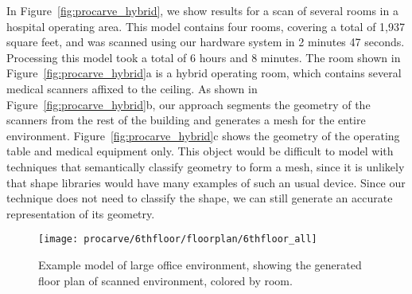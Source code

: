 \documentclass[12pt,onecolumn,oneside]{book}
\begin{document}
In Figure~\ref{fig:procarve_hybrid}, we show results for a scan of several rooms in a hospital operating area.  This model contains four rooms, covering a total of 1,937 square feet, and was scanned using our hardware system in 2 minutes 47 seconds.  Processing this model took a total of 6 hours and 8 minutes.  The room shown in Figure~\ref{fig:procarve_hybrid}a is a hybrid operating room, which contains several medical scanners affixed to the ceiling.  As shown in Figure~\ref{fig:procarve_hybrid}b, our approach segments the geometry of the scanners from the rest of the building and generates a mesh for the entire environment.  Figure~\ref{fig:procarve_hybrid}c shows the geometry of the operating table and medical equipment only.  This object would be difficult to model with techniques that semantically classify geometry to form a mesh, since it is unlikely that shape libraries would have many examples of such an usual device.  Since our technique does not need to classify the shape, we can still generate an accurate representation of its geometry.

\begin{figure}[t]

	\centerline{\texttt{[image: procarve/6thfloor/floorplan/6thfloor\_all]}}

	\caption[Example model of large office environment, showing floor plan.]{Example model of large office environment, showing the generated floor plan of scanned environment, colored by room.}
	\label{fig:procarve_6thfloor_floorplan}

\end{figure}
\end{document}
